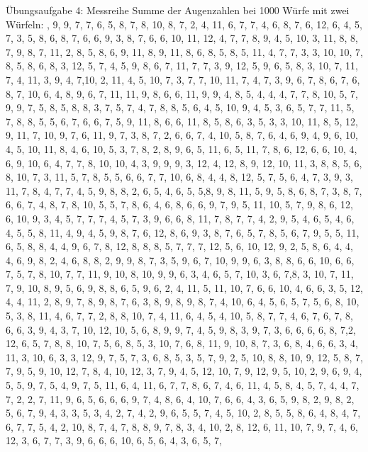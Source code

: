

Übungsaufgabe 4: \newline
Messreihe Summe der Augenzahlen bei 1000 Würfe mit zwei Würfeln: , 9, 9, 7, 7, 6, 5, 8, 7, 8, 10, 8, 7, 2, 4, 11, 6, 7, 7, 4, 6, 8, 7, 6, 12, 6, 4, 5, 7, 3, 5, 8, 6, 8, 7, 6, 6, 9, 3, 8, 7, 6, 6, 10, 11, 12, 4, 7, 7, 8, 9, 4, 5, 10, 3, 11, 8, 8, 7, 9, 8, 7, 11, 2, 8, 5, 8, 6, 9, 11, 8, 9, 11, 8, 6, 8, 5, 8, 5, 11, 4, 7, 7, 3, 3, 10, 10, 7, 8, 5, 8, 6, 8, 3, 12, 5, 7, 4, 5, 9, 8, 6, 7, 11, 7, 7, 3, 9, 12, 5, 9, 6, 5, 8, 3, 10, 7, 11, 7, 4, 11, 3, 9, 4, 7,10, 2, 11, 4, 5, 10, 7, 3, 7, 7, 10, 11, 7, 4, 7, 3, 9, 6, 7, 8, 6, 7, 6, 8, 7, 10, 6, 4, 8, 9, 6, 7, 11, 11, 9, 8, 6, 6, 11, 9, 9, 4, 8, 5, 4, 4, 4, 7, 7, 8, 10, 5, 7, 9, 9, 7, 5, 8, 5, 8, 8, 3, 7, 5, 7, 4, 7, 8, 8, 5, 6, 4, 5, 10, 9, 4, 5, 3, 6, 5, 7, 7, 11, 5, 7, 8, 8, 5, 5, 6, 7, 6, 6, 7, 5, 9, 11, 8, 6, 6, 11, 8, 5, 8, 6, 3, 5, 3, 3, 10, 11, 8, 5, 12, 9, 11, 7, 10, 9, 7, 6, 11, 9, 7, 3, 8, 7, 2, 6, 6, 7, 4, 10, 5, 8, 7, 6, 4, 6, 9, 4, 9, 6, 10, 4, 5, 10, 11, 8, 4, 6, 10, 5, 3, 7, 8, 2, 8, 9, 6, 5, 11, 6, 5, 11, 7, 8, 6, 12, 6, 6, 10, 4, 6, 9, 10, 6, 4, 7, 7, 8, 10, 10, 4, 3, 9, 9, 9, 3, 12, 4, 12, 8, 9, 12, 10, 11, 3, 8, 8, 5, 6, 8, 10, 7, 3, 11, 5, 7, 8, 5, 5, 6, 6, 7, 7, 10, 6, 8, 4, 4, 8, 12, 5, 7, 5, 6, 4, 7, 3, 9, 3, 11, 7, 8, 4, 7, 7, 4, 5, 9, 8, 8, 2, 6, 5, 4, 6, 5, 5,8, 9, 8, 11, 5, 9, 5, 8, 6, 8, 7, 3, 8, 7, 6, 6, 7, 4, 8, 7, 8, 10, 5, 5, 7, 8, 6, 4, 6, 8, 6, 6, 9, 7, 9, 5, 11, 10, 5, 7, 9, 8, 6, 12, 6, 10, 9, 3, 4, 5, 7, 7, 7, 4, 5, 7, 3, 9, 6, 6, 8, 11, 7, 8, 7, 7, 4, 2, 9, 5, 4, 6, 5, 4, 6, 4, 5, 5, 8, 11, 4, 9, 4, 5, 9, 8, 7, 6, 12, 8, 6, 9, 3, 8, 7, 6, 5, 7, 8, 5, 6, 7, 9, 5, 5, 11, 6, 5, 8, 8, 4, 4, 9, 6, 7, 8, 12, 8, 8, 8, 5, 7, 7, 7, 12, 5, 6, 10, 12, 9, 2, 5, 8, 6, 4, 4, 4, 6, 9, 8, 2, 4, 6, 8, 8, 2, 9, 9, 8, 7, 3, 5, 9, 6, 7, 10, 9, 9, 6, 3, 8, 8, 6, 6, 10, 6, 6, 7, 5, 7, 8, 10, 7, 7, 11, 9, 10, 8, 10, 9, 9, 6, 3, 4, 6, 5, 7, 10, 3, 6, 7,8, 3, 10, 7, 11, 7, 9, 10, 8, 9, 5, 6, 9, 8, 8, 6, 5, 9, 6, 2, 4, 11, 5, 11, 10, 7, 6, 6, 10, 4, 6, 6, 3, 5, 12, 4, 4, 11, 2, 8, 9, 7, 8, 9, 8, 7, 6, 3, 8, 9, 8, 9, 8, 7, 4, 10, 6, 4, 5, 6, 5, 7, 5, 6, 8, 10, 5, 3, 8, 11, 4, 6, 7, 7, 2, 8, 8, 10, 7, 4, 11, 6, 4, 5, 4, 10, 5, 8, 7, 7, 4, 6, 7, 6, 7, 8, 6, 6, 3, 9, 4, 3, 7, 10, 12, 10, 5, 6, 8, 9, 9, 7, 4, 5, 9, 8, 3, 9, 7, 3, 6, 6, 6, 6, 8, 7,2, 12, 6, 5, 7, 8, 8, 10, 7, 5, 6, 8, 5, 3, 10, 7, 6, 8, 11, 9, 10, 8, 7, 3, 6, 8, 4, 6, 6, 3, 4, 11, 3, 10, 6, 3, 3, 12, 9, 7, 5, 7, 3, 6, 8, 5, 3, 5, 7, 9, 2, 5, 10, 8, 8, 10, 9, 12, 5, 8, 7, 7, 9, 5, 9, 10, 12, 7, 8, 4, 10, 12, 3, 7, 9, 4, 5, 12, 10, 7, 9, 12, 9, 5, 10, 2, 9, 6, 9, 4, 5, 5, 9, 7, 5, 4, 9, 7, 5, 11, 6, 4, 11, 6, 7, 7, 8, 6, 7, 4, 6, 11, 4, 5, 8, 4, 5, 7, 4, 4, 7, 7, 2, 2, 7, 11, 9, 6, 5, 6, 6, 6, 9, 7, 4, 8, 6, 4, 10, 7, 6, 6, 4, 3, 6, 5, 9, 8, 2, 9, 8, 2, 5, 6, 7, 9, 4, 3, 3, 5, 3, 4, 2, 7, 4, 2, 9, 6, 5, 5, 7, 4, 5, 10, 2, 8, 5, 5, 8, 6, 4, 8, 4, 7, 6, 7, 7, 5, 4, 2, 10, 8, 7, 4, 7, 8, 8, 9, 7, 8, 3, 4, 10, 2, 8, 12, 6, 11, 10, 7, 9, 7, 4, 6, 12, 3, 6, 7, 7, 3, 9, 6, 6, 6, 10, 6, 5, 6, 4, 3, 6, 5, 7, 